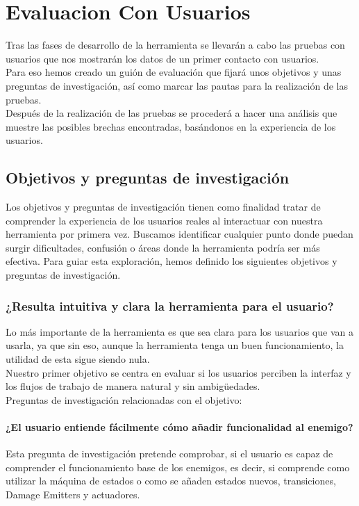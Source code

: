 \setcounter{secnumdepth}{3} %
\chapter{Evaluacion Con Usuarios}
\label{cap:evaluacionConUsuarios}
Tras las fases de desarrollo de la herramienta se llevarán a cabo las pruebas con usuarios que nos mostrarán los datos de un primer contacto con usuarios.\\
Para eso hemos creado un guión de evaluación que fijará unos objetivos y unas preguntas de investigación, así como marcar las pautas para la realización de las pruebas. \\
Después de la realización de las pruebas se procederá a hacer una análisis que muestre las posibles brechas encontradas, basándonos en la experiencia de los usuarios. \\

\section{Objetivos y preguntas de investigación}
Los objetivos y preguntas de investigación tienen como finalidad tratar de comprender la experiencia de los usuarios reales al interactuar con nuestra herramienta por primera vez. Buscamos identificar cualquier punto donde puedan surgir dificultades, confusión o áreas donde la herramienta podría ser más efectiva. Para guiar esta exploración, hemos definido los siguientes objetivos y preguntas de investigación.

\subsection{¿Resulta intuitiva y clara la herramienta para el usuario?}
Lo más importante de la herramienta es que sea clara para los usuarios que van a usarla, ya que sin eso, aunque la herramienta tenga un buen funcionamiento, la utilidad de esta sigue siendo nula.\\
Nuestro primer objetivo se centra en evaluar si los usuarios perciben la interfaz y los flujos de trabajo de manera natural y sin ambigüedades.\\

Preguntas de investigación relacionadas con el objetivo:
\subsubsection{¿El usuario entiende fácilmente cómo añadir funcionalidad al enemigo?}
Esta pregunta de investigación pretende comprobar, si el usuario es capaz de comprender el funcionamiento base de los enemigos, es decir, si comprende como utilizar la máquina de estados o como se añaden estados nuevos, transiciones, Damage Emitters y actuadores.\\

